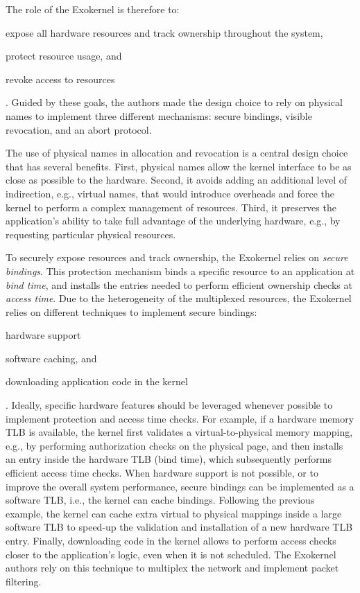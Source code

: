 The role of the Exokernel is therefore to:
\begin{enumerate*}
	\item \label{expose} expose all hardware resources and track ownership throughout the system,
	\item \label{protect} protect resource usage, and
	\item \label{revoke} revoke access to resources
\end{enumerate*}.
Guided by these goals, the authors made the design choice to rely on physical names to implement three different mechanisms: secure bindings, visible revocation, and an abort protocol.

The use of physical names in allocation and revocation is a central design choice that has several benefits.
First, physical names allow the kernel interface to be as close as possible to the hardware.
Second, it avoids adding an additional level of indirection, e.g., virtual names, that would introduce overheads and force the kernel to perform a complex management of resources.
Third, it preserves the application's ability to take full advantage of the underlying hardware, e.g., by requesting particular physical resources.

To securely expose resources and track ownership, the Exokernel relies on \emph{secure bindings}.
This protection mechanism binds a specific resource to an application at \emph{bind time}, and installs the entries needed to perform efficient ownership checks at \emph{access time}.
Due to the heterogeneity of the multiplexed resources, the Exokernel relies on different techniques to implement secure bindings:
\begin{enumerate*}
	\item hardware support
	\item software caching, and
	\item downloading application code in the kernel
\end{enumerate*}.
Ideally, specific hardware features should be leveraged whenever possible to implement protection and access time checks.
For example, if a hardware memory TLB is available, the kernel first validates a virtual-to-physical memory mapping, e.g., by performing authorization checks on the physical page, and then installs an entry inside the hardware TLB (bind time), which subsequently performs efficient access time checks.
When hardware support is not possible, or to improve the overall system performance, secure bindings can be implemented as a software TLB, i.e., the kernel can cache bindings.
Following the previous example, the kernel can cache extra virtual to physical mappings inside a large software TLB to speed-up the validation and installation of a new hardware TLB entry.
Finally, downloading code in the kernel allows to perform access checks closer to the application's logic, even when it is not scheduled.
The Exokernel authors rely on this technique to multiplex the network and implement packet filtering.

